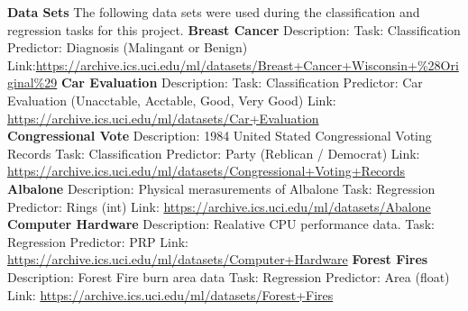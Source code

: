 \documentclass[twoside,11pt]{article}
\begin{document}
\newpage
{\noindent}{\bf Data Sets}\newline
The following data sets were used during the classification and regression tasks for this project.\newline
{\bf Breast Cancer}\newline
Description: \newline
Task: Classification\newline
Predictor: Diagnosis (Malingant or Benign)\newline
Link:\newline \url{https://archive.ics.uci.edu/ml/datasets/Breast+Cancer+Wisconsin+%28Original%29}\newline
{\noindent}\textbf{Car Evaluation}\newline
Description:\newline
Task: Classification\newline
Predictor: Car Evaluation (Unacctable, Acctable, Good, Very Good)\newline
Link: \newline
\url{https://archive.ics.uci.edu/ml/datasets/Car+Evaluation}\\
{\noindent}\textbf{Congressional Vote}\newline
Description: 1984 United Stated Congressional Voting Records\newline
Task: Classification \newline
Predictor: Party (Reblican / Democrat) \newline
Link: \newline
\url{https://archive.ics.uci.edu/ml/datasets/Congressional+Voting+Records}\newline
{\noindent}\textbf{Albalone}\newline
Description: Physical merasurements of Albalone\newline
Task: Regression\newline
Predictor: Rings (int)\newline
Link: \newline
\url{https://archive.ics.uci.edu/ml/datasets/Abalone}\newline
{\noindent}\textbf{Computer Hardware}\newline
Description: Realative CPU performance data.\newline
Task: Regression\newline
Predictor: PRP\newline
Link: \newline
\url{https://archive.ics.uci.edu/ml/datasets/Computer+Hardware}\newline
{\noindent}\textbf{Forest Fires}\newline
Description: Forest Fire burn area data\newline
Task: Regression\newline
Predictor: Area (float)\newline
Link: \newline
\url{https://archive.ics.uci.edu/ml/datasets/Forest+Fires}\newline
	
\end{document}
